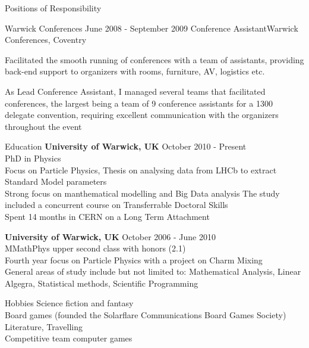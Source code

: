 \documentclass{format/resume} %
\begin{document}
\begin{rSection}{Positions of Responsibility}
\begin{rSubsection}{Warwick Conferences}{ June 2008 - September 2009
  }{Conference Assistant}{Warwick Conferences, Coventry}
\item Facilitated the smooth running of conferences with a team of
  assistants, providing back-end support to organizers with rooms,
  furniture, AV, logistics etc.
\item As Lead Conference Assistant, I managed several teams that
  facilitated conferences, the largest being a team of 9 conference
  assistants for a 1300
  delegate convention, requiring excellent communication with the
  organizers throughout the event
\end{rSubsection}

\end{rSection}


\begin{rSection}{Education}
{\bf University of Warwick, UK} \hfill {October 2010 - Present} \\
PhD in Physics\\
Focus on Particle Physics, Thesis on analysing data from LHCb to
extract Standard Model parameters\\
Strong focus on manthematical modelling and Big Data analysis
The study included a concurrent course on Transferrable Doctoral Skills \\
Spent 14 months in CERN on a Long Term Attachment

{\bf University of Warwick, UK} \hfill {October 2006 - June 2010} \\
MMathPhys upper second class with honors (2.1)\\
Fourth year focus on Particle Physics with a project on Charm Mixing\\
General areas of study include but not limited to: Mathematical
Analysis, Linear Algegra, Statistical methods, Scientific Programming
\end{rSection}

\begin{rSection}{Hobbies}
Science fiction and fantasy \\
Board games (founded the Solarflare Communications Board Games Society) \\
Literature, Travelling \\
Competitive team computer games \\
\end{rSection}
\end{document}
